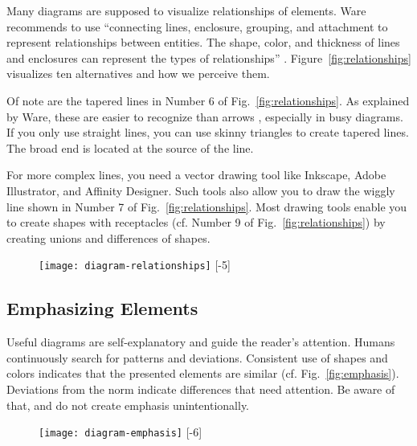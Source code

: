 Many diagrams are supposed to visualize relationships of elements. Ware recommends to use ``connecting lines, enclosure, grouping, and attachment to represent relationships between entities. The shape, color, and thickness of lines and enclosures can represent the types of relationships'' \cite{Ware12}. Figure~\ref{fig:relationships} visualizes ten alternatives and how we perceive them.

Of note are the tapered lines in Number 6 of Fig.~\ref{fig:relationships}. As explained by Ware, these are easier to recognize than arrows \cite{Ware12}, especially in busy diagrams. If you only use straight lines, you can use skinny triangles to create tapered lines. The broad end is located at the source of the line.

For more complex lines, you need a vector drawing tool like Inkscape, Adobe Illustrator, and Affinity Designer. Such tools also allow you to draw the wiggly line shown in Number 7 of Fig.~\ref{fig:relationships}. Most drawing tools enable you to create shapes with receptacles (cf. Number 9 of Fig.~\ref{fig:relationships}) by creating unions and differences of shapes.



\begin{figure}[t]
\centering
\texttt{[image: diagram-relationships]}
[-5\baselineskip]
\end{figure}



\subsection{Emphasizing Elements}

Useful diagrams are self-explanatory and guide the reader's attention. Humans continuously search for patterns and deviations. Consistent use of shapes and colors indicates that the presented elements are similar (cf. Fig.~\ref{fig:emphasis}). Deviations from the norm indicate differences that need attention. Be aware of that, and do not create emphasis unintentionally.

\begin{figure}[t]
\centering
\texttt{[image: diagram-emphasis]}
[-6\baselineskip]
\end{figure}

